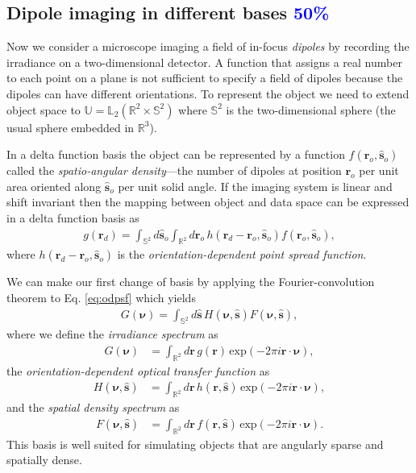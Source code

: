 \documentclass{osa-article}
\providecommand{\mb}[1]{\mathbf{#1}}
\providecommand{\ro}{\mathbf{\mathbf{r}}_o}
\providecommand{\so}{\mathbf{\hat{s}}_o}
\providecommand{\rd}{\mathbf{r}_d}
\providecommand{\mh}[1]{\mathbf{\hat{#1}}}
\providecommand{\mbb}[1]{\mathbb{#1}}
\providecommand{\bs}[1]{\boldsymbol{#1}}
\providecommand{\tb}[1]{\textcolor{blue}{#1}}
\begin{document}
\subsection{Dipole imaging in different bases \tb{50\%}}\label{sec:dipole}
Now we consider a microscope imaging a field of in-focus \textit{dipoles} by
recording the irradiance on a two-dimensional detector. A function that assigns
a real number to each point on a plane is not sufficient to specify a field of
dipoles because the dipoles can have different orientations. To represent the
object we need to extend object space to
$\mbb{U} = \mbb{L}_2(\mbb{R}^2\times\mbb{S}^2)$ where $\mbb{S}^2$ is the
two-dimensional sphere (the usual sphere embedded in $\mbb{R}^3$).

In a delta function basis the object can be represented by a function
$f(\ro, \so)$ called the \textit{spatio-angular density}---the number of dipoles
at position $\ro{}$ per unit area oriented along $\so{}$ per unit solid angle.
If the imaging system is linear and shift invariant then the mapping between
object and data space can be expressed in a delta function basis as
  \begin{align}
g(\rd{}) = \int_{\mbb{S}^2}d\so{}\int_{\mbb{R}^2}d\ro{}\, h(\rd{} -\ro{}, \so{})f(\ro, \so), \label{eq:odpsf}
  \end{align}
  where $h(\rd - \ro, \so)$ is the \textit{orientation-dependent point spread
    function}.

  We can make our first change of basis by applying the Fourier-convolution
  theorem to Eq. \ref{eq:odpsf} which yields
\begin{align}
G(\bs{\nu}) = \int_{\mbb{S}^2}d\mh{s}\, H(\bs{\nu}, \mh{s})F(\bs{\nu}, \mh{s}) \label{eq:odotf},
\end{align}
where we define the \textit{irradiance spectrum} as
\begin{align}
  G(\bs{\nu}) &= \int_{\mbb{R}^2}d\mb{r}\, g(\mb{r})\, \text{exp}(-2\pi i\mb{r}\cdot\bs{\nu}),
  \end{align}
  the \textit{orientation-dependent optical transfer function} as
  \begin{align}
  H(\bs{\nu}, \mh{s}) &= \int_{\mbb{R}^2}d\mb{r}\, h(\mb{r}, \mh{s})\, \text{exp}(-2\pi i\mb{r}\cdot\bs{\nu}),
  \end{align}
  and the \textit{spatial density spectrum} as
  \begin{align}
  F(\bs{\nu}, \mh{s}) &= \int_{\mbb{R}^2}d\mb{r}\, f(\mb{r}, \mh{s})\, \text{exp}(-2\pi i\mb{r}\cdot\bs{\nu}). 
  \end{align}
  This basis is well suited for simulating objects that are angularly sparse and
  spatially dense.
  
\end{document}
